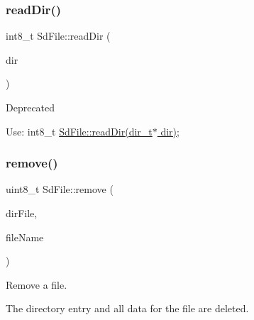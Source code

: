 \subsubsection{\texorpdfstring{read\+Dir()}{readDir()}\hspace{0.1cm}{\footnotesize\ttfamily [2/2]}}
{\footnotesize\ttfamily int8\+\_\+t Sd\+File\+::read\+Dir (\begin{DoxyParamCaption}\item[{\hyperlink{_fat_structs_8h_a803db59d4e16a0c54a647afc6a7954e3}{dir\+\_\+t} \&}]{dir }\end{DoxyParamCaption})\hspace{0.3cm}{\ttfamily [inline]}}

\begin{DoxyRefDesc}{Deprecated}
\item[\hyperlink{deprecated__deprecated000010}{Deprecated}]Use\+: int8\+\_\+t \hyperlink{class_sd_file_ab240540b099cedcfe8b93b5e853d0628}{Sd\+File\+::read\+Dir(dir\+\_\+t$\ast$ dir)}; \end{DoxyRefDesc}
\mbox{\label{class_sd_file_ab932b7896dce90a29031f3a9039807a2}} 
\subsubsection{\texorpdfstring{remove()}{remove()}\hspace{0.1cm}{\footnotesize\ttfamily [1/3]}}
{\footnotesize\ttfamily uint8\+\_\+t Sd\+File\+::remove (\begin{DoxyParamCaption}\item[{\hyperlink{class_sd_file}{Sd\+File} $\ast$}]{dir\+File,  }\item[{const char $\ast$}]{file\+Name }\end{DoxyParamCaption})\hspace{0.3cm}{\ttfamily [static]}}

Remove a file.

The directory entry and all data for the file are deleted.


